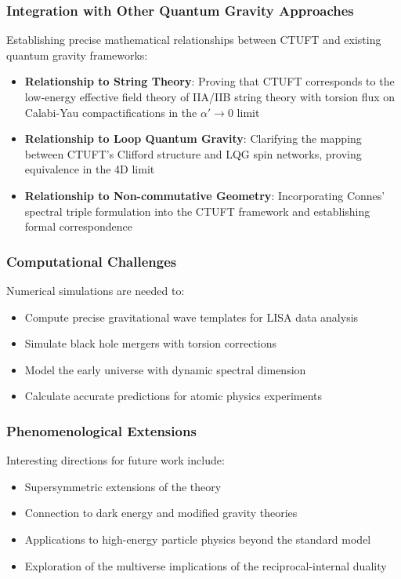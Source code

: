 \subsubsection{Integration with Other Quantum Gravity Approaches}

Establishing precise mathematical relationships between CTUFT and existing quantum gravity frameworks:
\begin{itemize}
    \item \textbf{Relationship to String Theory}: Proving that CTUFT corresponds to the low-energy effective field theory of IIA/IIB string theory with torsion flux on Calabi-Yau compactifications in the $\alpha' \to 0$ limit
    \item \textbf{Relationship to Loop Quantum Gravity}: Clarifying the mapping between CTUFT's Clifford structure and LQG spin networks, proving equivalence in the 4D limit
    \item \textbf{Relationship to Non-commutative Geometry}: Incorporating Connes' spectral triple formulation into the CTUFT framework and establishing formal correspondence
\end{itemize}

\subsubsection{Computational Challenges}

Numerical simulations are needed to:
\begin{itemize}
    \item Compute precise gravitational wave templates for LISA data analysis
    \item Simulate black hole mergers with torsion corrections
    \item Model the early universe with dynamic spectral dimension
    \item Calculate accurate predictions for atomic physics experiments
\end{itemize}

\subsubsection{Phenomenological Extensions}

Interesting directions for future work include:
\begin{itemize}
    \item Supersymmetric extensions of the theory
    \item Connection to dark energy and modified gravity theories
    \item Applications to high-energy particle physics beyond the standard model
    \item Exploration of the multiverse implications of the reciprocal-internal duality
\end{itemize}

